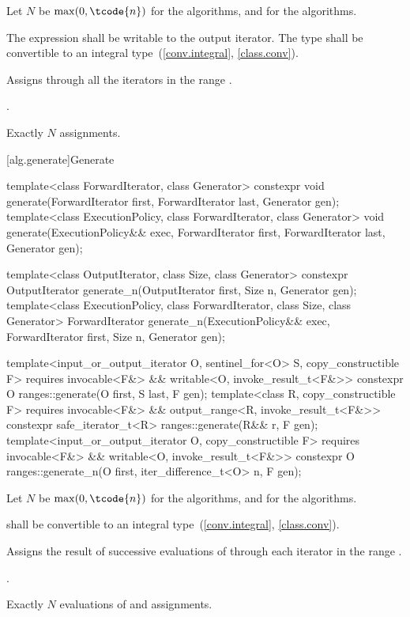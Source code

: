 \begin{itemdescr}
\pnum
Let $N$ be $\max(0, \tcode{n})$ for the  algorithms, and
 for the  algorithms.

\pnum
\requires
The expression 
shall be writable to the output iterator.
The type  shall be convertible
to an integral type~(\ref{conv.integral}, \ref{class.conv}).

\pnum
\effects
Assigns 
through all the iterators in the range .

\pnum
\returns
{}.

\pnum
\complexity
Exactly $N$ assignments.
\end{itemdescr}

[alg.generate]{Generate}

%
%
\begin{itemdecl}
template<class ForwardIterator, class Generator>
  constexpr void generate(ForwardIterator first, ForwardIterator last,
                          Generator gen);
template<class ExecutionPolicy, class ForwardIterator, class Generator>
  void generate(ExecutionPolicy&& exec,
                ForwardIterator first, ForwardIterator last,
                Generator gen);

template<class OutputIterator, class Size, class Generator>
  constexpr OutputIterator generate_n(OutputIterator first, Size n, Generator gen);
template<class ExecutionPolicy, class ForwardIterator, class Size, class Generator>
  ForwardIterator generate_n(ExecutionPolicy&& exec,
                             ForwardIterator first, Size n, Generator gen);

template<input_or_output_iterator O, sentinel_for<O> S, copy_constructible F>
  requires invocable<F&> && writable<O, invoke_result_t<F&>>
  constexpr O ranges::generate(O first, S last, F gen);
template<class R, copy_constructible F>
  requires invocable<F&> && output_range<R, invoke_result_t<F&>>
  constexpr safe_iterator_t<R> ranges::generate(R&& r, F gen);
template<input_or_output_iterator O, copy_constructible F>
  requires invocable<F&> && writable<O, invoke_result_t<F&>>
  constexpr O ranges::generate_n(O first, iter_difference_t<O> n, F gen);
\end{itemdecl}

\begin{itemdescr}
\pnum
Let $N$ be $\max(0, \tcode{n})$ for the  algorithms, and
 for the  algorithms.

\pnum
\requires
{} shall be convertible
to an integral type~(\ref{conv.integral}, \ref{class.conv}).

\pnum
\effects
Assigns the result of successive evaluations of 
through each iterator in the range .

\pnum
\returns
{}.

\pnum
\complexity
Exactly $N$ evaluations of  and assignments.
\end{itemdescr}

